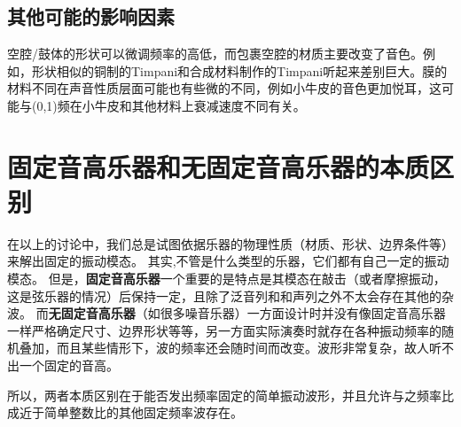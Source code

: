 \subsection{其他可能的影响因素}
空腔/鼓体的形状可以微调频率的高低，而包裹空腔的材质主要改变了音色。例如，形状相似的铜制的Timpani和合成材料制作的Timpani听起来差别巨大。膜的材料不同在声音性质层面可能也有些微的不同，例如小牛皮的音色更加悦耳，这可能与(0,1)频在小牛皮和其他材料上衰减速度不同有关。

\section{固定音高乐器和无固定音高乐器的本质区别}
在以上的讨论中，我们总是试图依据乐器的物理性质（材质、形状、边界条件等）来解出固定的振动模态。
其实,不管是什么类型的乐器，它们都有自己一定的振动模态。
但是，\textbf{固定音高乐器}一个重要的是特点是其模态在敲击（或者摩擦振动，这是弦乐器的情况）后保持一定，且除了泛音列和和声列之外不太会存在其他的杂波。
而\textbf{无固定音高乐器}（如很多噪音乐器）一方面设计时并没有像固定音高乐器一样严格确定尺寸、边界形状等等，另一方面实际演奏时就存在各种振动频率的随机叠加，而且某些情形下，波的频率还会随时间而改变。波形非常复杂，故人听不出一个固定的音高。

所以，两者本质区别在于能否发出频率固定的简单振动波形，并且允许与之频率比成近于简单整数比的其他固定频率波存在。
